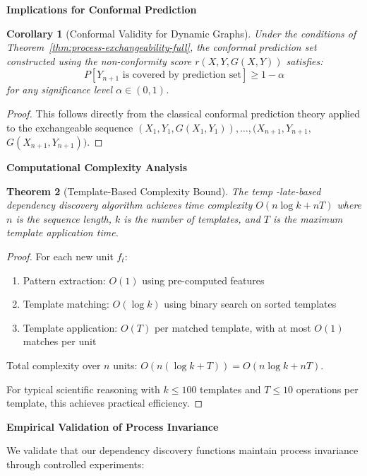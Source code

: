 \documentclass{uai2026} %
\theoremstyle{remark}
\theoremstyle{plain}
\newtheorem{theorem}{Theorem} %
\newtheorem{corollary}[theorem]{Corollary}
\theoremstyle{definition}
\begin{document}
\textbf{Implications for Conformal Prediction}

\begin{corollary}[Conformal Validity for Dynamic Graphs]
\label{cor:conformal-validity}
Under the conditions of Theorem~\ref{thm:process-exchangeability-full}, the conformal prediction set constructed using the non-conformity score $r(X,Y,G(X,Y))$ satisfies:
$$P[Y_{n+1} \text{ is covered by prediction set}] \geq 1-\alpha$$
for any significance level $\alpha \in (0,1)$.
\end{corollary}

\begin{proof}
This follows directly from the classical conformal prediction theory applied to the exchangeable sequence $(X_1,Y_1,G(X_1,Y_1)),\allowbreak \ldots,\allowbreak(X_{n+1},Y_{n+1},$ $G(X_{n+1},Y_{n+1}))$.
\end{proof}

\textbf{Computational Complexity Analysis}

\begin{theorem}[Template-Based Complexity Bound]
\label{thm:complexity-bound}
The temp
-late-based dependency discovery algorithm achieves time complexity $O(n \log k + nT)$ where $n$ is the sequence length, $k$ is the number of templates, and $T$ is the maximum template application time.
\end{theorem}

\begin{proof}
For each new unit $f_t$:
\begin{enumerate}
\item Pattern extraction: $O(1)$ using pre-computed features
\item Template matching: $O(\log k)$ using binary search on sorted templates
\item Template application: $O(T)$ per matched template, with at most $O(1)$ matches per unit
\end{enumerate}

Total complexity over $n$ units: $O(n(\log k + T)) = O(n \log k + nT)$.

For typical scientific reasoning with $k \leq 100$ templates and $T \leq 10$ operations per template, this achieves practical efficiency.
\end{proof}

\textbf{Empirical Validation of Process Invariance}

We validate that our dependency discovery functions maintain process invariance through controlled experiments:
\end{document}
